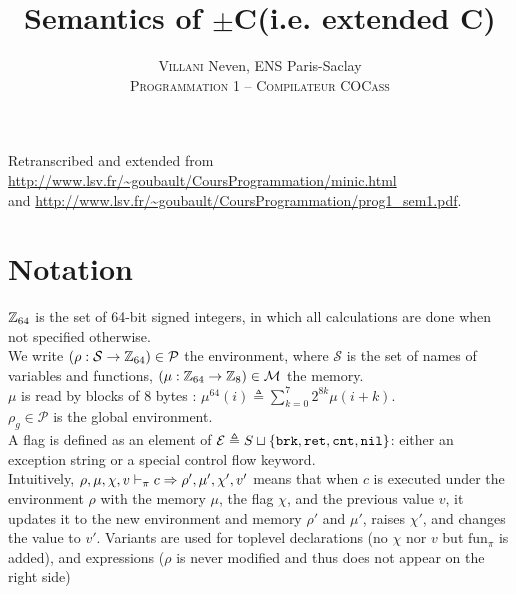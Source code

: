 

\newcommand{\Cmp}{\(\pm\)C}
\newcommand{\Cmm}{C\textminus\textminus}
\newcommand{\fun}{\text{fun}_\pi}
\newcommand{\fnptr}{\text{fun}_\mu^n}
\newcommand{\gives}{\vdash_\pi}
\newcommand{\brk}{\t{brk}}
\newcommand{\ret}{\t{ret}}
\newcommand{\cnt}{\t{cnt}}
\newcommand{\nil}{\t{nil}}

\title{Semantics of \Cmp (i.e. extended \Cmm)}
\author{\textsc{Villani} Neven, ENS Paris-Saclay\\\textsc{Programmation 1 -- Compilateur COCass}}


\maketitle

Retranscribed and extended from \url{http://www.lsv.fr/~goubault/CoursProgrammation/minic.html}\\
and \url{http://www.lsv.fr/~goubault/CoursProgrammation/prog1_sem1.pdf}.\\


\section*{Notation}

\(\mathbb{Z}_{64}\) is the set of 64-bit signed integers, in which all calculations are done when not specified otherwise.\\

We write \((\rho: \mathcal{S}\to\mathbb{Z}_{64})\in \mathcal{P}\) the environment, where \(\mathcal{S}\) is the set of names of variables and functions, \((\mu: \mathbb{Z}_{64}\to\mathbb{Z}_{8})\in \mathcal{M}\) the memory.\\
\(\mu\) is read by blocks of 8 bytes : \(\mu^{64}(i) \triangleq \sum_{k=0}^7 2^{8k}\mu(i+k)\).\\
\(\rho_g\in\mathcal{P}\) is the global environment.\\

A flag is defined as an element of \(\mathcal{E} \triangleq S \sqcup \{ \brk, \ret, \cnt, \nil \}\): either an exception string or a special control flow keyword.\\
Intuitively, \(\rho,\mu,\chi,v \gives c \tto \rho',\mu',\chi',v'\) means that when \(c\) is executed under the environment \(\rho\) with the memory \(\mu\), the flag \(\chi\), and the previous value \(v\), it updates it to the new environment and memory \(\rho'\) and \(\mu'\), raises \(\chi'\), and changes the value to \(v'\). Variants are used for toplevel declarations (no \(\chi\) nor \(v\) but \(\fun\) is added), and expressions (\(\rho\) is never modified and thus does not appear on the right side)\\

